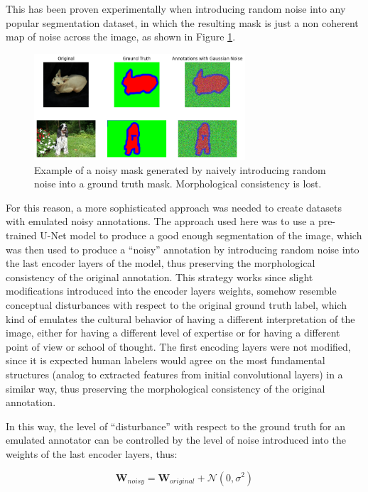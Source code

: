 This has been proven experimentally when introducing random noise into any
popular segmentation dataset, in which the resulting mask is just a non
coherent map of noise across the image, as shown in Figure
\ref{fig:noisy_masks}.

\begin{figure}[h]
  \centering
  \includegraphics[width=0.7\textwidth]{Cap2/Figures/naive_gaussian_noise.png}
  \caption{Example of a noisy mask generated by naively introducing random
  noise into a ground truth mask. Morphological consistency is lost.}
  \label{fig:noisy_masks}
\end{figure}

For this reason, a more sophisticated approach was needed to create
datasets with emulated noisy annotations. The approach used here was
to use a pre-trained U-Net model to produce a good enough segmentation
of the image, which was then used to produce a ``noisy'' annotation by
introducing random noise into the last encoder layers of the model, thus
preserving the morphological consistency of the original annotation.
This strategy works since slight modifications introduced into
the encoder layers weights, somehow resemble conceptual disturbances with
respect to the original ground truth label, which kind of emulates
the cultural behavior of having a different interpretation of the
image, either for having a different level of expertise or for having a
different point of view or school of thought. The first encoding layers
were not modified, since it is expected human labelers would agree on the
most fundamental structures (analog to extracted features from initial
convolutional layers) in a similar way, thus preserving the morphological
consistency of the original annotation.

In this way, the level of ``disturbance'' with respect to the ground
truth for an emulated annotator can be controlled by the level of
noise introduced into the weights of the last encoder layers, thus:

\begin{equation}
  \mathbf{W}_{noisy} = \mathbf{W}_{original} + \mathcal{N}(0, \sigma^2)
\end{equation}

